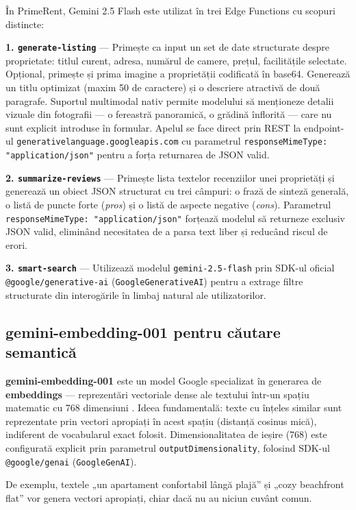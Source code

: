 \documentclass[12pt,a4paper,oneside]{report}
\begin{document}
În PrimeRent, Gemini 2.5 Flash este utilizat în trei Edge Functions cu scopuri distincte:

\textbf{1. \texttt{generate-listing}} — Primește ca input un set de date structurate despre proprietate: titlul curent, adresa, numărul de camere, prețul, facilitățile selectate. Opțional, primește și prima imagine a proprietății codificată în base64. Generează un titlu optimizat (maxim 50 de caractere) și o descriere atractivă de două paragrafe. Suportul multimodal nativ permite modelului să menționeze detalii vizuale din fotografii — o fereastră panoramică, o grădină înflorită — care nu sunt explicit introduse în formular. Apelul se face direct prin REST la endpoint-ul \texttt{generativelanguage.googleapis.com} cu parametrul \texttt{responseMimeType: "application/json"} pentru a forța returnarea de JSON valid.

\textbf{2. \texttt{summarize-reviews}} — Primește lista textelor recenziilor unei proprietăți și generează un obiect JSON structurat cu trei câmpuri: o frază de sinteză generală, o listă de puncte forte (\textit{pros}) și o listă de aspecte negative (\textit{cons}). Parametrul \texttt{responseMimeType: "application/json"} forțează modelul să returneze exclusiv JSON valid, eliminând necesitatea de a parsa text liber și reducând riscul de erori.

\textbf{3. \texttt{smart-search}} — Utilizează modelul \texttt{gemini-2.5-flash} prin SDK-ul oficial \texttt{@google/generative-ai} (\texttt{GoogleGenerativeAI}) pentru a extrage filtre structurate din interogările în limbaj natural ale utilizatorilor.

\subsection{gemini-embedding-001 pentru căutare semantică}

\textbf{gemini-embedding-001} este un model Google specializat în generarea de \textbf{embeddings} — reprezentări vectoriale dense ale textului într-un spațiu matematic cu 768 dimensiuni \cite{gemini-embeddings}. Ideea fundamentală: texte cu înțeles similar sunt reprezentate prin vectori apropiați în acest spațiu (distanță cosinus mică), indiferent de vocabularul exact folosit. Dimensionalitatea de ieșire (768) este configurată explicit prin parametrul \texttt{outputDimensionality}, folosind SDK-ul \texttt{@google/genai} (\texttt{GoogleGenAI}).

De exemplu, textele „un apartament confortabil lângă plajă'' și „cozy beachfront flat'' vor genera vectori apropiați, chiar dacă nu au niciun cuvânt comun.
\end{document}
